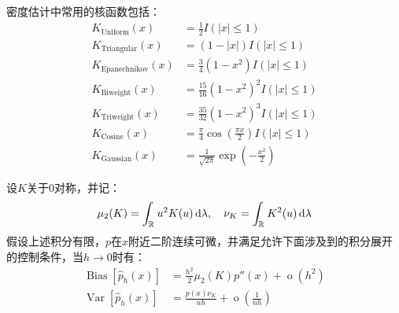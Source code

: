 密度估计中常用的核函数包括：
\begin{align*}
	K_{\mathrm{Uniform}}(x)&=\frac{1}{2}I(|x|\leqslant1) \\
	K_{\mathrm{Triangular}}(x)&=(1-|x|)I(|x|\leqslant1) \\
	K_{\mathrm{Epanechnikov}}(x)&=\frac{3}{4}(1-x^2)I(|x|\leqslant1) \\
	K_{\mathrm{Biweight}}(x)&=\frac{15}{16}(1-x^2)^2I(|x|\leqslant1) \\
	K_{\mathrm{Triweight}}(x)&=\frac{35}{32}(1-x^2)^3I(|x|\leqslant1) \\
	K_{\mathrm{Cosine}}(x)&=\frac{\pi}{4}\cos\left(\frac{\pi x}{2}\right)I(|x|\leqslant1) \\
	K_{\mathrm{Gaussian}}(x)&=\frac{1}{\sqrt{2\pi}}\exp\left(-\frac{x^2}{2}\right)
\end{align*}
\begin{property}\label{prop:KDEBiasVariance}
	设$K$关于$0$对称，并记：
	\begin{equation*}
		\mu_2(K)=\int_{\mathbb{R}^{}}u^2K(u)\mathop{}\!\mathrm{d}\lambda,\quad\nu_K=\int_{\mathbb{R}^{}}K^2(u)\mathop{}\!\mathrm{d}\lambda
	\end{equation*}
	假设上述积分有限，$p$在$x$附近二阶连续可微，并满足允许下面涉及到的积分展开的控制条件，当$h\to0$时有：
	\begin{align*}
		\operatorname{Bias}[\hat{p}_h(x)]&=\frac{h^2}{2}\mu_2(K)p''(x)+\operatorname{o}(h^2) \\
		\operatorname{Var}[\hat{p}_h(x)]&=\frac{p(x)\nu_K}{nh}+\operatorname{o}\left(\frac{1}{nh}\right)
	\end{align*}
\end{property}
